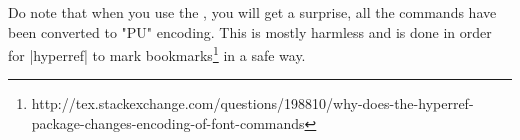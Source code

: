 
Do note that when you use the , you will get a surprise, all the commands have been converted to "PU" encoding. This is mostly harmless and is  done in order for |hyperref| to mark bookmarks\footnote{http://tex.stackexchange.com/questions/198810/why-does-the-hyperref-package-changes-encoding-of-font-commands} in a safe way.


